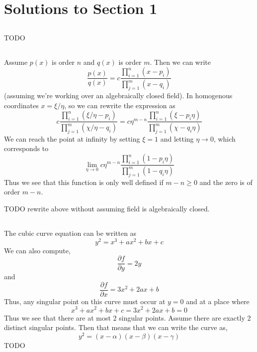 \documentclass{article}
\begin{document}

\section{Solutions to Section 1}

\subsection{}
TODO

\subsection{}
Assume \(p(x)\) is order \(n\) and \(q(x)\) is order \(m\). Then we can write
\begin{equation}
\frac{p(x)}{q(x)} = c\frac{\prod_{i=1}^{n}(x-p_{i})}{\prod_{j=1}^{m}(x-q_{i})}
\end{equation}
(assuming we're working over an algebraically closed field). In homogenous coordinates \(x=\xi/\eta\), so we can rewrite the expression as
\begin{equation}
c\frac{\prod_{i=1}^{n}(\xi/\eta -p_{i})}{\prod_{j=1}^{m}(\chi/\eta-q_{i})} = c\eta^{m-n}\frac{\prod_{i=1}^{n}(\xi -p_{i}\eta)}{\prod_{j=1}^{m}(\chi-q_{i}\eta)}
\end{equation}
We can reach the point at infinity by setting \(\xi=1\) and letting \(\eta \to 0\), which corresponds to
\begin{equation}
\lim_{\eta \to 0} c\eta^{m-n}\frac{\prod_{i=1}^{n}(1 -p_{i}\eta)}{\prod_{j=1}^{m}(1-q_{i}\eta)}
\end{equation}
Thus we see that this function is only well defined if \(m-n \geq 0\) and the zero is of order \(m-n\).

TODO rewrite above without assuming field is algebraically closed.

\subsection{}
The cubic curve equation can be written as
\begin{equation}
y^{2} = x^{3} + ax^{2} + bx + c
\end{equation}
We can also compute,
\begin{equation}
\frac{\partial f}{\partial y} = 2y
\end{equation}
and
\begin{equation}
\frac{\partial f}{\partial x} = 3x^{2} + 2ax + b
\end{equation}
Thus, any singular point on this curve must occur at \(y=0\) and at a place where
\begin{equation}
x^{3} + ax^{2} + bx + c = 3x^{2} + 2ax + b = 0
\end{equation}
Thus we see that there are at most 2 singular points. Assume there are exactly 2 distinct singular points. Then that means that we can write the curve as,
\begin{equation}
y^{2} = (x-\alpha)(x-\beta)(x-\gamma)
\end{equation}
TODO
\end{document}
